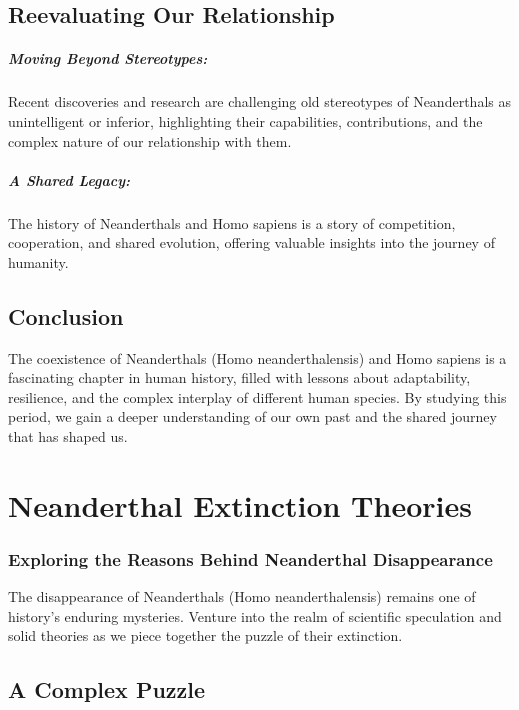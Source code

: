 \documentclass{book}
\begin{document}
\section*{Reevaluating Our Relationship}

\paragraph{Moving Beyond Stereotypes:}
Recent discoveries and research are challenging old stereotypes of Neanderthals as unintelligent or inferior, highlighting their capabilities, contributions, and the complex nature of our relationship with them.

\paragraph{A Shared Legacy:}
The history of Neanderthals and Homo sapiens is a story of competition, cooperation, and shared evolution, offering valuable insights into the journey of humanity.

\section*{Conclusion}

The coexistence of Neanderthals (Homo neanderthalensis) and Homo sapiens is a fascinating chapter in human history, filled with lessons about adaptability, resilience, and the complex interplay of different human species. By studying this period, we gain a deeper understanding of our own past and the shared journey that has shaped us.

\chapter{Neanderthal Extinction Theories}
\subsection*{Exploring the Reasons Behind Neanderthal Disappearance}
The disappearance of Neanderthals (Homo neanderthalensis) remains one of history's enduring mysteries. Venture into the realm of scientific speculation and solid theories as we piece together the puzzle of their extinction.

\section*{A Complex Puzzle}
\end{document}
